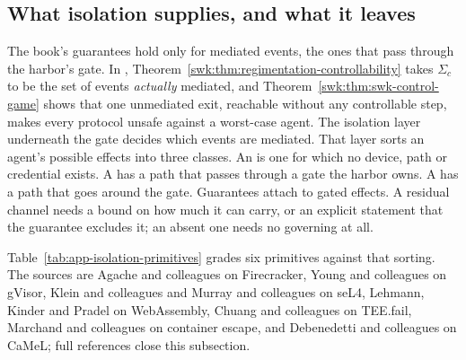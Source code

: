 \subsection{What isolation supplies, and what it leaves}\label{app:isolation}

The book's guarantees hold only for mediated events, the ones that pass
through the harbor's gate. In
,
Theorem~\ref{swk:thm:regimentation-controllability} takes $\Sigma_c$ to be the
set of events \emph{actually} mediated, and
Theorem~\ref{swk:thm:swk-control-game} shows that one unmediated exit, reachable
without any controllable step, makes every protocol unsafe against a
worst-case agent. The isolation layer underneath the gate decides which events
are mediated. That layer sorts an agent's possible effects into three classes.
An  is one for which no device, path or credential
exists. A  has a path that passes through a gate the
harbor owns. A  has a path that goes around the gate.
Guarantees attach to gated effects. A residual channel needs a bound on how
much it can carry, or an explicit statement that the guarantee excludes it; an
absent one needs no governing at all.

Table~\ref{tab:app-isolation-primitives} grades six primitives against that
sorting. The sources are Agache and colleagues on Firecracker, Young and
colleagues on gVisor, Klein and colleagues and Murray and colleagues on seL4,
Lehmann, Kinder and Pradel on WebAssembly, Chuang and colleagues on TEE.fail,
Marchand and colleagues on container escape, and Debenedetti and colleagues
on CaMeL; full references close this subsection.

